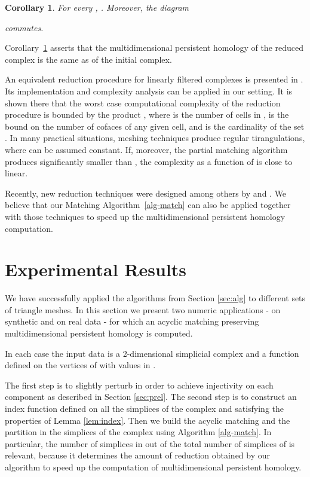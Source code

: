 \documentclass[12pt]{article}
\newtheorem{cor}[thm]{Corollary}
\begin{document}
\medskip

\begin{cor}\label{cor:homology-S-iso-C}
For every , .
Moreover, the diagram

commutes.
\end{cor}

Corollary~\ref{cor:homology-S-iso-C} asserts that the multidimensional persistent homology of the reduced complex is the same as of the initial complex.

An equivalent reduction procedure for linearly filtered complexes is presented in \cite{MiNa}. Its implementation and complexity analysis can be applied in our setting. It is shown there that the worst case computational complexity of the reduction procedure is bounded by the product , where  is the number of cells in ,  is the bound on the number of cofaces of any given cell, and  is the cardinality of the set . In many practical situations, meshing techniques produce regular tirangulations, where  can be assumed constant. If, moreover, the partial matching algorithm produces  significantly smaller than , the complexity as a function of  is close to linear.

Recently, new reduction techniques were designed among others by \cite{DloWag} and \cite[Section C.2]{Rat15}. We believe that our Matching Algorithm~\ref{alg-match} can also be applied together with those techniques to speed up the multidimensional persistent homology computation.


\section{Experimental Results}\label{sec:experiments}

We have successfully applied the algorithms from Section \ref{sec:alg}
to different sets of triangle meshes. In this
section we present two numeric applications - on synthetic and on real data - for which
an acyclic matching preserving multidimensional persistent homology is computed.

In each case the input data is a 2-dimensional simplicial complex   and a function  defined on the vertices of  with values in .

The first step is to slightly perturb  in order to achieve injectivity on each component as described in Section \ref{sec:prel}. The second step is to construct an index function defined on all the simplices of the complex and satisfying the properties of Lemma \ref{lem:index}. Then we build
the acyclic matching  and the partition  in the simplices of the complex using Algorithm \ref{alg-match}. In particular, the number of simplices in  out of the total number of simplices of  is relevant, because it determines the amount of reduction obtained by our algorithm to speed up the computation of multidimensional persistent homology.
\end{document}
